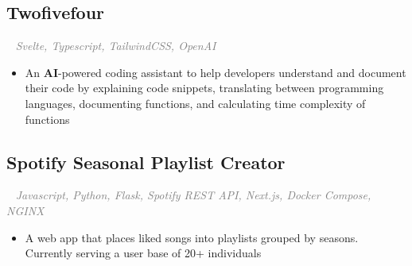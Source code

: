\documentclass{article}
\newcommand{\projectsection}[3]{
    \subsection*{#1}
    \ 
    \small
    \textcolor{grey}{\emph{#2}}
    \normalsize
    \hfill
    \textcolor{black}{#3}
    \small
}
\begin{document}
\projectsection{Twofivefour}{Svelte, Typescript, TailwindCSS, OpenAI}{}
\begin{itemize}
    \item An \textbf{AI}-powered coding assistant to help developers understand and document their code by explaining code snippets, translating between programming languages, documenting functions, and calculating time complexity of functions
\end{itemize}

\projectsection{Spotify Seasonal Playlist Creator}{Javascript, Python, Flask, Spotify REST API, Next.js, Docker Compose, NGINX}{}
\begin{itemize}
    \item A web app that places liked songs into playlists grouped by seasons. Currently serving a user base of 20+ individuals
\end{itemize}
\end{document}
